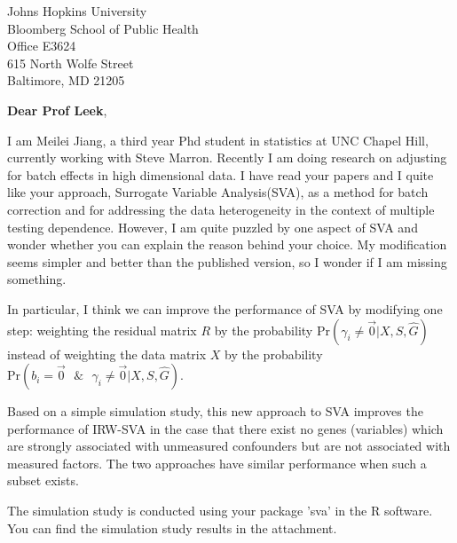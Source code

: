 \documentclass{letter}
\begin{document}

\begin{letter}{Johns Hopkins University \\
                     Bloomberg School of Public Health \\ 
                     Office E3624 \\ 
                     615 North Wolfe Street  \\ 
                     Baltimore, MD 21205} %


\opening{\textbf{Dear Prof Leek},}
 
I am Meilei Jiang, a third year Phd student in statistics at UNC Chapel Hill, currently working with Steve Marron. Recently I am doing research on adjusting for batch effects in high dimensional data. I have read your papers and I quite like your approach, Surrogate Variable Analysis(SVA), as a method for batch correction and for addressing the data heterogeneity in the context of multiple testing dependence. However, I am quite puzzled by one aspect of SVA and wonder whether you can explain the reason behind your choice. My modification seems simpler and better than the published version, so I wonder if I am missing something.

In particular, I think we can improve the performance of SVA by modifying one step: weighting the residual matrix $R$ by the probability $\text{Pr}( \gamma_i \neq \vec{0}| X, S, \hat{G})$ instead of weighting the data matrix $X$ by the probability $\text{Pr}(b_i = \vec{0} \text{ } \& \text{ } \gamma_i \neq \vec{0} | X, S, \hat{G})$.

Based on a simple simulation study, this new approach to SVA improves the performance of IRW-SVA in the case that there exist no genes (variables) which are strongly associated with unmeasured confounders but are not associated with measured factors. The two approaches have similar performance when such a subset exists. 

The simulation study is conducted using your package 'sva' in the R software. You can find the simulation study results in the attachment.



\end{letter}
\end{document}
